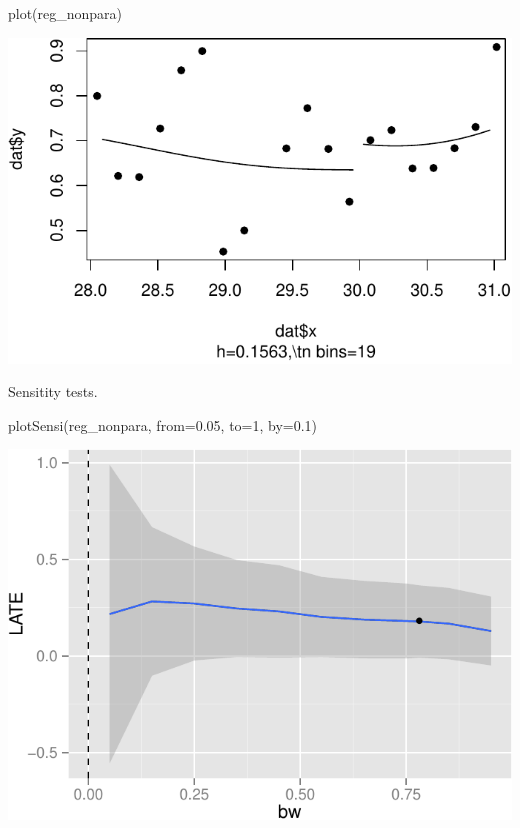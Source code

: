 \documentclass[article]{jss}
\begin{document}
\begin{CodeChunk}
\begin{CodeInput}
plot(reg_nonpara)
\end{CodeInput}


\begin{center}\includegraphics{README_files/figure-latex/unnamed-chunk-11-1} \end{center}

\end{CodeChunk}

Sensitity tests.

\begin{CodeChunk}
\begin{CodeInput}
plotSensi(reg_nonpara, from=0.05, to=1, by=0.1)
\end{CodeInput}


\begin{center}\includegraphics{README_files/figure-latex/unnamed-chunk-12-1} \end{center}

\end{CodeChunk}
\end{document}
